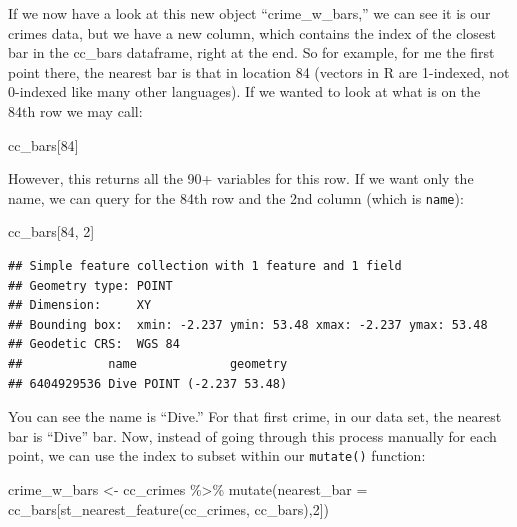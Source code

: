 \documentclass[
  krantz2]{krantz}
\makeatletter
\newenvironment{Shaded}{\begin{snugshade}}{\end{snugshade}}
\newcommand{\AttributeTok}[1]{\textcolor[rgb]{0.61,0.61,0.61}{#1}}
\newcommand{\DecValTok}[1]{\textcolor[rgb]{0.06,0.06,0.06}{#1}}
\newcommand{\FunctionTok}[1]{\textcolor[rgb]{0,0,0}{#1}}
\newcommand{\NormalTok}[1]{#1}
\newcommand{\OtherTok}[1]{\textcolor[rgb]{0.37,0.37,0.37}{#1}}
\newcommand{\SpecialCharTok}[1]{\textcolor[rgb]{0,0,0}{#1}}
\newenvironment{kframe}{%
\medskip{}
\setlength{\fboxsep}{.8em}
 \def\at@end@of@kframe{}%
 \ifinner\ifhmode%
  \def\at@end@of@kframe{\end{minipage}}%
  \begin{minipage}{\columnwidth}%
 \fi\fi%
 \def\FrameCommand##1{\hskip\@totalleftmargin \hskip-\fboxsep
 \colorbox{shadecolor}{##1}\hskip-\fboxsep
     \hskip-\linewidth \hskip-\@totalleftmargin \hskip\columnwidth}%
 \MakeFramed {\advance\hsize-\width
   \@totalleftmargin\z@ \linewidth\hsize
   \@setminipage}}%
 {\par\unskip\endMakeFramed%
 \at@end@of@kframe}
\renewenvironment{Shaded}{\begin{kframe}}{\end{kframe}}
\makeatother
\begin{document}
If we now have a look at this new object ``crime\_w\_bars,'' we can see it is our crimes data, but we have a new column, which contains the index of the closest bar in the cc\_bars dataframe, right at the end. So for example, for me the first point there, the nearest bar is that in location 84 (vectors in R are 1-indexed, not 0-indexed like many other languages). If we wanted to look at what is on the 84th row we may call:

\begin{Shaded}
\begin{Highlighting}[]
\NormalTok{cc\_bars[}\DecValTok{84}\NormalTok{]}
\end{Highlighting}
\end{Shaded}

However, this returns all the 90+ variables for this row. If we want only the name, we can query for the 84th row and the 2nd column (which is \texttt{name}):

\begin{Shaded}
\begin{Highlighting}[]
\NormalTok{cc\_bars[}\DecValTok{84}\NormalTok{, }\DecValTok{2}\NormalTok{]}
\end{Highlighting}
\end{Shaded}

\begin{verbatim}
## Simple feature collection with 1 feature and 1 field
## Geometry type: POINT
## Dimension:     XY
## Bounding box:  xmin: -2.237 ymin: 53.48 xmax: -2.237 ymax: 53.48
## Geodetic CRS:  WGS 84
##            name             geometry
## 6404929536 Dive POINT (-2.237 53.48)
\end{verbatim}

You can see the name is ``Dive.'' For that first crime, in our data set, the nearest bar is ``Dive'' bar. Now, instead of going through this process manually for each point, we can use the index to subset within our \texttt{mutate()} function:

\begin{Shaded}
\begin{Highlighting}[]
\NormalTok{crime\_w\_bars  }\OtherTok{\textless{}{-}}\NormalTok{ cc\_crimes }\SpecialCharTok{\%\textgreater{}\%} 
  \FunctionTok{mutate}\NormalTok{(}\AttributeTok{nearest\_bar =}\NormalTok{ cc\_bars[}\FunctionTok{st\_nearest\_feature}\NormalTok{(cc\_crimes, cc\_bars),}\DecValTok{2}\NormalTok{])}
\end{Highlighting}
\end{Shaded}
\end{document}
